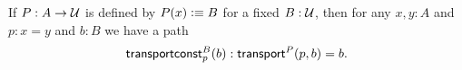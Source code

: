 \documentclass[hott-all.tex]{subfiles}
\begin{document}
\begin{lem}\label{thm:trans-trivial}
  If $P:A\to\mathcal{U}$ is defined by $P(x) \vcentcolon\equiv B$ for a fixed $B:\mathcal{U}$, then for any $x,y:A$ and $p:x=y$ and $b:B$ we have a path
  \[ \mathsf{transportconst}^{B}_{p}(b) : \mathsf{transport}^{P}(p,b) = b. \]
\end{lem}
%

\end{document}

